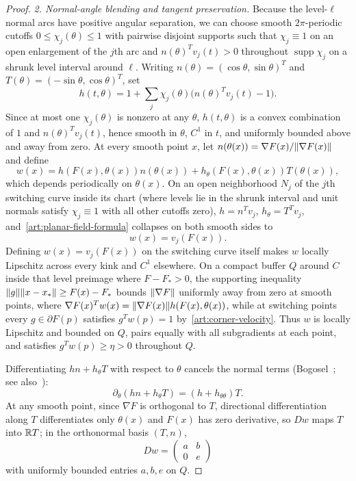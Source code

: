 \begin{proof}
\emph{2. Normal-angle blending and tangent preservation.}
Because the level-$\ell$ normal arcs have positive angular separation, we can
choose smooth $2\pi$-periodic cutoffs $0\le\chi_j(\theta)\le1$ with pairwise
disjoint supports such that $\chi_j\equiv1$ on an open enlargement of the $j$th
arc and $n(\theta)^Tv_j(t)>0$ throughout $\operatorname{supp}\chi_j$ on a
shrunk level interval around $\ell$. Writing $n(\theta)=(\cos\theta,\sin\theta)^T$
and $T(\theta)=(-\sin\theta,\cos\theta)^T$, set
\begin{equation}\label{art:planar-height}
 h(t,\theta)=1+\sum_j\chi_j(\theta)\bigl(n(\theta)^Tv_j(t)-1\bigr).
\end{equation}
Since at most one $\chi_j(\theta)$ is nonzero at any $\theta$, $h(t,\theta)$ is
a convex combination of $1$ and $n(\theta)^Tv_j(t)$, hence smooth in $\theta$,
$C^1$ in $t$, and uniformly bounded above and away from zero. At every smooth
point $x$, let $n(\theta(x))=\nabla F(x)/\lVert\nabla F(x)\rVert$ and define
\begin{equation}\label{art:planar-field-formula}
 w(x)=h(F(x),\theta(x))n(\theta(x))
       +h_\theta(F(x),\theta(x))T(\theta(x)),
\end{equation}
which depends periodically on $\theta(x)$. On an open neighborhood $N_j$ of the
$j$th switching curve inside its chart (where levels lie in the shrunk interval
and unit normals satisfy $\chi_j\equiv1$ with all other cutoffs zero), $h=n^Tv_j$,
$h_\theta=T^Tv_j$, and~\eqref{art:planar-field-formula} collapses on both smooth
sides to
\begin{equation}\label{art:planar-corner-field}
 w(x)=v_j(F(x)).
\end{equation}
Defining $w(x)=v_j(F(x))$ on the switching curve itself makes $w$ locally
Lipschitz across every kink and $C^1$ elsewhere. On a compact buffer $Q$ around
$C$ inside that level preimage where $F-F_*>0$, the supporting inequality
$\lVert g\rVert\lVert x-x_*\rVert\ge F(x)-F_*$
bounds $\lVert\nabla F\rVert$ uniformly away from zero at smooth points, where
$\nabla F(x)^Tw(x)=\lVert\nabla F(x)\rVert h(F(x),\theta(x))$, while at switching
points every $g\in\partial F(p)$ satisfies $g^Tw(p)=1$ by~\eqref{art:corner-velocity}.
Thus $w$ is locally Lipschitz and bounded on $Q$, pairs equally with all
subgradients at each point, and satisfies $g^Tw(p)\ge\eta>0$ throughout $Q$.

Differentiating $hn+h_\theta T$ with respect to $\theta$ cancels the normal
terms (Bogosel~\cite{geom_Bogosel2023}; see also~):
\begin{equation}\label{art:planar-tangent-cancellation}
 \partial_\theta(hn+h_\theta T)=(h+h_{\theta\theta})T.
\end{equation}
At any smooth point, since $\nabla F$ is orthogonal to $T$, directional
differentiation along $T$ differentiates only $\theta(x)$ and $F(x)$ has zero
derivative, so $Dw$ maps $T$ into $\mathbb R T$; in the orthonormal basis $(T,n)$,
\[
 Dw=\begin{pmatrix}a&b\\0&e\end{pmatrix}
\]
with uniformly bounded entries $a,b,e$ on $Q$.


\end{proof}
